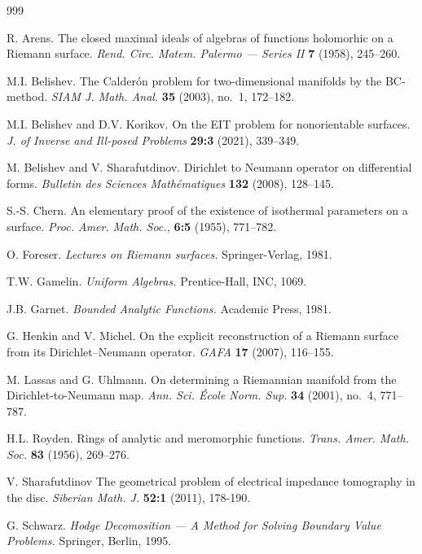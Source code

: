\documentclass[12pt,reqno]{amsart}
\begin{document}
\begin{thebibliography}{999}

R. Arens.
The closed maximal ideals of algebras of functions holomorhic on a Riemann surface.
{\it Rend. Circ. Matem. Palermo --- Series II} {\bf 7} (1958), 245--260.

M.I. Belishev.
The Calder\'{o}n problem for two-dimensional manifolds by the BC-method.
{\it SIAM J. Math. Anal.} {\bf 35} (2003), no.~1, 172--182.

M.I. Belishev and D.V. Korikov.
On the EIT problem for nonorientable surfaces.
{\it J. of Inverse and Ill-posed Problems} {\bf 29:3} (2021), 339--349.

M. Belishev and V. Sharafutdinov.
Dirichlet to Neumann operator on differential forms.
{\it Bulletin des Sciences Math\'{e}matiques} {\bf 132} (2008), 128--145.

S.-S. Chern.
An elementary proof of the existence of isothermal parameters on a surface.
{\it Proc. Amer. Math. Soc.,} {\bf 6:5} (1955), 771--782.

O. Foreser.
{\it Lectures on Riemann surfaces.} Springer-Verlag, 1981.

T.W. Gamelin.
{\it Uniform Algebras.}
Prentice-Hall, INC, 1069.

J.B. Garnet.
{\it Bounded Analytic Functions.}
Academic Press, 1981.

G. Henkin and V. Michel.
On the explicit reconstruction of a Riemann surface from its Dirichlet--Neumann operator.
{\it GAFA} {\bf 17} (2007), 116--155.

M. Lassas and G. Uhlmann.
On determining a Riemannian manifold from the Dirichlet-to-Neumann map.
{\it Ann. Sci. \'{E}cole Norm. Sup.} {\bf 34} (2001), no.~4, 771--787.

H.L. Royden.
Rings of analytic and meromorphic functions.
{\it Trans. Amer. Math. Soc.} {\bf 83} (1956), 269--276.

V. Sharafutdinov
The geometrical problem of electrical impedance tomography in the disc.
{\it Siberian Math. J.} {\bf 52:1} (2011), 178-190.

G. Schwarz.
{\it Hodge Decomosition --- A Method for Solving Boundary Value Problems.}
Springer, Berlin, 1995.



\end{thebibliography}
\end{document}
